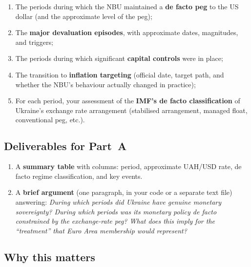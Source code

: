 \documentclass[11pt,a4paper]{article}
\begin{document}
\begin{enumerate}[label=(\alph*), leftmargin=2em]

  \item The periods during which the NBU maintained a \textbf{de facto peg} to
  the US dollar (and the approximate level of the peg);

  \item The \textbf{major devaluation episodes}, with approximate dates,
  magnitudes, and triggers;

  \item The periods during which significant \textbf{capital controls} were in
  place;

  \item The transition to \textbf{inflation targeting} (official date, target
  path, and whether the NBU's behaviour actually changed in practice);

  \item For each period, your assessment of the \textbf{IMF's de facto
  classification} of Ukraine's exchange rate arrangement (stabilised
  arrangement, managed float, conventional peg, etc.).

\end{enumerate}

\subsection*{Deliverables for Part~A}

\begin{enumerate}[label=\textbf{\arabic*.}, leftmargin=2em]

  \item A \textbf{summary table} with columns: period, approximate UAH/USD
  rate, de facto regime classification, and key events.

  \item A \textbf{brief argument} (one paragraph, in your code or a separate
  text file) answering: \emph{During which periods did Ukraine have genuine
  monetary sovereignty? During which periods was its monetary policy de facto
  constrained by the exchange-rate peg? What does this imply for the
  ``treatment'' that Euro Area membership would represent?}

\end{enumerate}

\subsection*{Why this matters}
\end{document}
